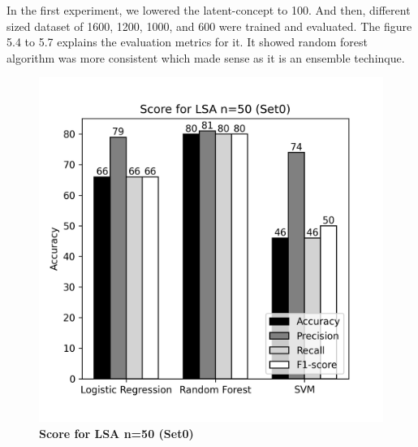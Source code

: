 \documentclass[12pt]{report}
\begin{document}
             In the first experiment, we lowered the latent-concept to 100. And then, different sized dataset of 1600, 1200, 1000, and 600 were 
             trained and evaluated. The figure 5.4 to 5.7 explains the evaluation metrics for it. It showed random forest algorithm 
             was more consistent which made sense as it is an ensemble techinque. 


             
             \begin{figure}[!htb]
                \begin{minipage}{0.48\textwidth}
                  \centering
                  \includegraphics[scale=0.55]{plots/Score for LSA n=50 (Set0).png}
                  \caption{\textbf{Score for LSA n=50 (Set0)}}\label{Fig:typo1}
                \end{minipage}\hfill
                \begin{minipage}{0.48\textwidth}
                  \centering

\end{minipage}
\end{figure}
\end{document}
